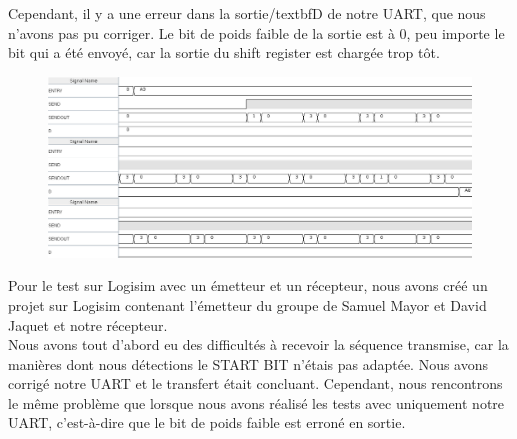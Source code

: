 \documentclass[a4paper]{article} %
\begin{document}
\begin{tcolorbox}[colframe=Monokaimagenta,colback=white]

Cependant, il y a une erreur dans la sortie/textbf{D} de notre UART, que nous n'avons pas pu corriger. Le bit de poids faible de la sortie est à 0, peu importe le bit qui a été envoyé, car la sortie du shift register est chargée trop tôt.\\
\begin{figure}[H]
\centering
    \includegraphics[width=1\textwidth]{src/CHRONO_EMISSION.png}
    \label{fig:chrono_emetteur}
\end{figure}
Pour le test sur Logisim avec un émetteur et un récepteur, nous avons créé un projet sur Logisim contenant l'émetteur du groupe de Samuel Mayor et David Jaquet et notre récepteur.\\
Nous avons tout d'abord eu des difficultés à recevoir la séquence transmise, car la manières dont nous détections le START BIT n'étais pas adaptée. Nous avons corrigé notre UART et le transfert était concluant. Cependant, nous rencontrons le même problème que lorsque nous avons réalisé les tests avec uniquement notre UART, c'est-à-dire que le bit de poids faible est erroné en sortie.
\end{tcolorbox}
\pagebreak
\end{document}
